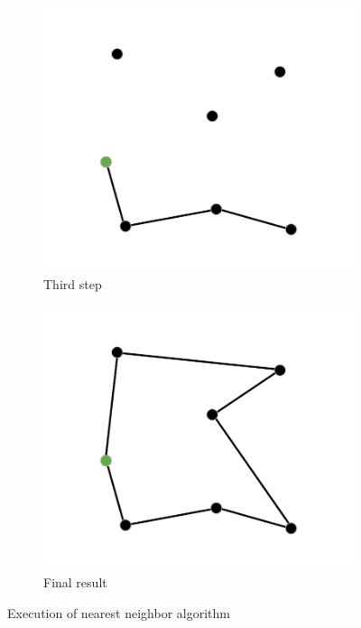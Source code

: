 \begin{figure}[h!]
  \begin{subfigure}[b]{0.49\linewidth}
    \includegraphics[width=\linewidth]{media/fase3.pdf}
    \caption{Third step}
  \end{subfigure}
  \begin{subfigure}[b]{0.49\linewidth}
    \includegraphics[width=\linewidth]{media/fase4.pdf}
    \caption{Final result}
  \end{subfigure}
  \caption{Execution of nearest neighbor algorithm}
\end{figure}


